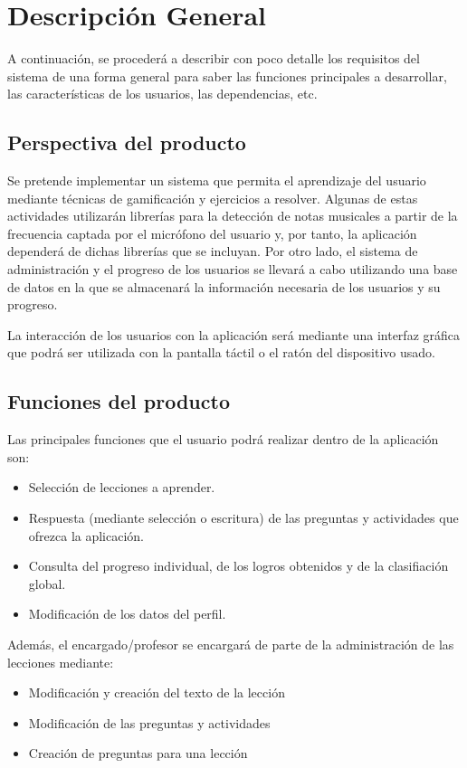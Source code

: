 \section{Descripción General}
A continuación, se procederá a describir con poco detalle los requisitos del sistema de una forma general para saber las funciones principales a desarrollar, las características de los usuarios, las dependencias, etc.
\subsection{Perspectiva del producto}
Se pretende implementar un sistema que permita el aprendizaje del usuario mediante técnicas de gamificación y ejercicios a resolver. Algunas de estas actividades utilizarán librerías para la detección de notas musicales
a partir de la frecuencia captada por el micrófono del usuario y, por tanto, la aplicación dependerá de dichas librerías que se incluyan.
Por otro lado, el sistema de administración y el progreso de los usuarios se llevará a cabo utilizando una base de datos en la que se almacenará la información necesaria de los usuarios y su progreso.

La interacción de los usuarios con la aplicación será mediante una interfaz gráfica que podrá ser utilizada con la pantalla táctil o el ratón del dispositivo usado.

\subsection{Funciones del producto}
Las principales funciones que el usuario podrá realizar dentro de la aplicación son:
\begin{itemize}
    \item Selección de lecciones a aprender.
    \item Respuesta (mediante selección o escritura) de las preguntas y actividades que ofrezca la aplicación.
    \item Consulta del progreso individual, de los logros obtenidos y de la clasifiación global.
    \item Modificación de los datos del perfil.
\end {itemize}

Además, el encargado/profesor se encargará de parte de la administración de las lecciones mediante:
\begin{itemize}
    \item Modificación y creación del texto de la lección
    \item Modificación de las preguntas y actividades
    \item Creación de preguntas para una lección
\end{itemize}

